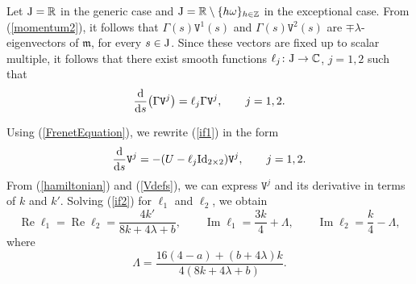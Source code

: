 \documentclass[pdftex]{sigma}
\newcommand\kk{k} %
\def\R{\mathbb R}
\def\Z{\mathbb Z}
\newcommand\tV{\mathtt{V}}
\renewcommand\Re{\operatorname{Re}}
\renewcommand\Im{\operatorname{Im}}
\numberwithin{equation}{section}
\begin{document}
Let ${\rm J}=\R$ in the generic case and ${\rm J}=\R\setminus \{h\omega\}_{h\in \Z}$ in the exceptional case. From (\ref{momentum2}), it follows that $\Gamma(s) {\mathtt V}^1(s)$ and $\Gamma(s) {\mathtt V}^2(s)$ are $\mp \lambda$-eigenvectors of ${\mathfrak m}$, for every $s\in {\rm J}$.
Since these vectors are fixed up to scalar multiple,
it follows that there exist smooth functions
$\ell_j\colon {\rm J}\to {\mathbb C}$, $j=1,2$ such that
\begin{equation}\label{if1}\frac{{\rm d}}{{\rm d}s}\bigl(\Gamma {\mathtt V}^j\bigr) =\ell_j \Gamma {\mathtt V}^j,\qquad j=1,2.
\end{equation}

Using (\ref{FrenetEquation}), we rewrite ({\ref{if1}) in the form
\begin{equation}\label{if2}
\frac{{\rm d}}{{\rm d}s}\tV^j
=-(U-\ell_j{\rm Id}_{2\times 2}){\mathtt V}^j,\qquad j = 1,2.
\end{equation}
From (\ref{hamiltonian}) and (\ref{Vdefs}), we can express ${\mathtt V}^j$ and its derivative in terms of $\kk$ and $\kk'$. Solving (\ref{if2}}) for $\ell_{1}$ and $\ell_{2}$, we obtain
\[
\Re \ell_1=\Re \ell_2=\frac{4\kk'}{8\kk+4\lambda+b}, \qquad
\Im \ell_1=\frac{3\kk}{4}+\Lambda,\qquad
\Im \ell_2=\frac{\kk}{4}-\Lambda,
\]
where
\begin{equation}\label{Lambda}
\Lambda = \frac{16(4-a)+(b+4\lambda)\kk}{4(8\kk+4\lambda+b)}.
\end{equation}
\end{document}
